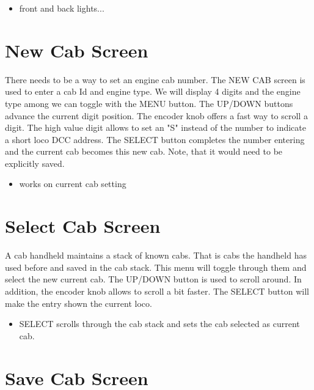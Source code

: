 \begin{itemize}
\begin{itemize}
\item front and back lights...
\end{itemize}
\end{itemize}

\section{New Cab Screen}

There needs to be a way to set an engine cab number. The NEW CAB screen is used to enter a cab Id and engine type. We will display 4 digits and the engine type among we can toggle with the MENU button. The UP/DOWN buttons advance the current digit position. The encoder knob offers a fast way to scroll a digit. The high value digit allows to set an "S" instead of the number to indicate a short loco DCC address. The SELECT button completes the number entering and the current cab becomes this new cab. Note, that it would need to be explicitly saved.
\begin{itemize}
\begin{itemize}
\item works on current cab setting
\end{itemize}
\end{itemize}

\section{Select Cab Screen}

A cab handheld maintains a stack of known cabs. That is cabs the handheld has used before and saved in the cab stack. This menu will toggle through them and select the new current cab. The UP/DOWN button is used to scroll around. In addition, the encoder knob allows to scroll a bit faster. The SELECT button will make the entry shown the current loco.
\begin{itemize}
\begin{itemize}
\item SELECT scrolls through the cab stack and sets the cab selected as current cab.
\end{itemize}
\end{itemize}

\section{Save Cab Screen}

